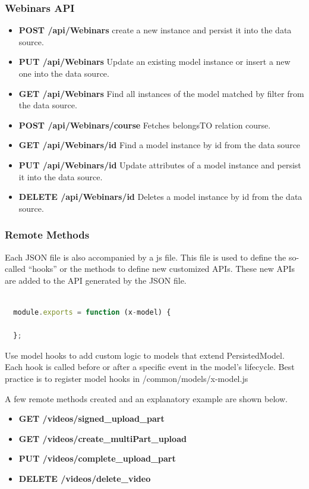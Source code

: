 \subsubsection{Webinars API}
\begin{itemize}
\item \textbf{POST /api/Webinars} create a new instance and persist it into the data source.
\item \textbf{PUT /api/Webinars} Update an existing model instance or insert a new one into the data source.
\item \textbf{GET /api/Webinars} Find all instances of the model matched by filter from the  data source.
\item \textbf{POST /api/Webinars/course} Fetches belongsTO relation course.
\item \textbf{GET /api/Webinars/id} Find a model instance by id from the data source
\item \textbf{PUT /api/Webinars/id} Update attributes of a model instance and persist it into the data source.
\item \textbf{DELETE /api/Webinars/id} Deletes a model instance by id from the data 
source.
\end{itemize}

 \subsubsection{ Remote Methods }

Each JSON file is also accompanied by a js file. This file is used to define the so-called “hooks” or the methods to define new customized APIs. These new APIs are added to the API generated by the JSON file.

\begin{lstlisting}[language=javascript]

  module.exports = function (x-model) {
  
  };
\end{lstlisting}


Use model hooks to add custom logic to models that extend PersistedModel. Each hook is called before or after a specific event in the model's lifecycle.
Best practice is to register model hooks in /common/models/x-model.js

A few remote methods created and an explanatory example are shown below.

\begin{itemize}
\item \textbf{GET /videos/signed\_upload\_part }
\item \textbf{GET /videos/create\_multiPart\_upload}
\item \textbf{PUT /videos/complete\_upload\_part }
\item \textbf{DELETE /videos/delete\_video}
\end{itemize}

